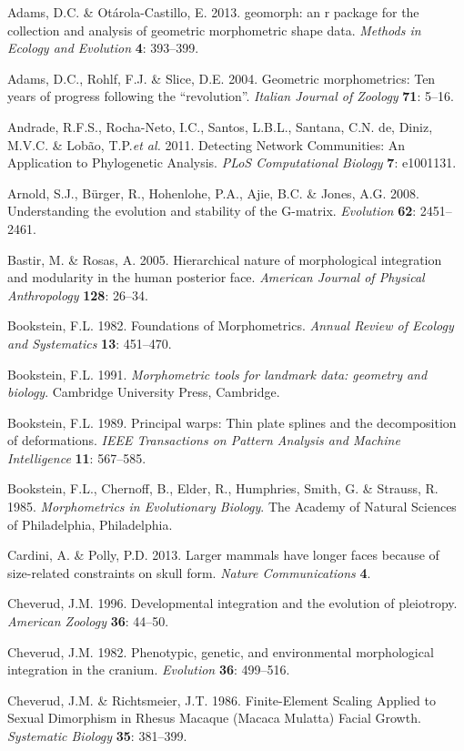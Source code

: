 \documentclass[12pt,]{article}
\begin{document}
Adams, D.C. \& Otárola-Castillo, E. 2013. geomorph: an r package for the
collection and analysis of geometric morphometric shape data.
\emph{Methods in Ecology and Evolution} \textbf{4}: 393--399.

Adams, D.C., Rohlf, F.J. \& Slice, D.E. 2004. Geometric morphometrics:
Ten years of progress following the ``revolution''. \emph{Italian
Journal of Zoology} \textbf{71}: 5--16.

Andrade, R.F.S., Rocha-Neto, I.C., Santos, L.B.L., Santana, C.N. de,
Diniz, M.V.C. \& Lobão, T.P.\emph{et al.} 2011. Detecting Network
Communities: An Application to Phylogenetic Analysis. \emph{PLoS
Computational Biology} \textbf{7}: e1001131.

Arnold, S.J., Bürger, R., Hohenlohe, P.A., Ajie, B.C. \& Jones, A.G.
2008. Understanding the evolution and stability of the G-matrix.
\emph{Evolution} \textbf{62}: 2451--2461.

Bastir, M. \& Rosas, A. 2005. Hierarchical nature of morphological
integration and modularity in the human posterior face. \emph{American
Journal of Physical Anthropology} \textbf{128}: 26--34.

Bookstein, F.L. 1982. Foundations of Morphometrics. \emph{Annual Review
of Ecology and Systematics} \textbf{13}: 451--470.

Bookstein, F.L. 1991. \emph{Morphometric tools for landmark data:
geometry and biology}. Cambridge University Press, Cambridge.

Bookstein, F.L. 1989. Principal warps: Thin plate splines and the
decomposition of deformations. \emph{IEEE Transactions on Pattern
Analysis and Machine Intelligence} \textbf{11}: 567--585.

Bookstein, F.L., Chernoff, B., Elder, R., Humphries, Smith, G. \&
Strauss, R. 1985. \emph{Morphometrics in Evolutionary Biology}. The
Academy of Natural Sciences of Philadelphia, Philadelphia.

Cardini, A. \& Polly, P.D. 2013. Larger mammals have longer faces
because of size-related constraints on skull form. \emph{Nature
Communications} \textbf{4}.

Cheverud, J.M. 1996. Developmental integration and the evolution of
pleiotropy. \emph{American Zoology} \textbf{36}: 44--50.

Cheverud, J.M. 1982. Phenotypic, genetic, and environmental
morphological integration in the cranium. \emph{Evolution} \textbf{36}:
499--516.

Cheverud, J.M. \& Richtsmeier, J.T. 1986. Finite-Element Scaling Applied
to Sexual Dimorphism in Rhesus Macaque (Macaca Mulatta) Facial Growth.
\emph{Systematic Biology} \textbf{35}: 381--399.
\end{document}
